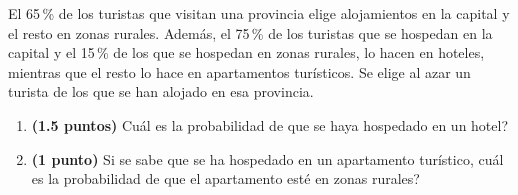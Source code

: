 
El 65\,\% de los turistas que visitan una provincia elige alojamientos en la
capital y el resto en zonas rurales. Además, el 75\,\% de los turistas que
se hospedan en la capital y el 15\,\% de los que se hospedan en zonas rurales,
lo hacen en hoteles, mientras que el resto lo hace en apartamentos turísticos.
Se elige al azar un turista de los que se han alojado en esa provincia.

\begin{enumerate}[label=\alph*)]
  \item \textbf{(1.5 puntos)} \textquestiondown{}Cuál es la probabilidad de que
  se haya hospedado en un hotel?
  \item \textbf{(1 punto)} Si se sabe que se ha hospedado en un apartamento
  turístico, \textquestiondown{}cuál es la probabilidad de que el apartamento
  esté en zonas rurales?
\end{enumerate}
